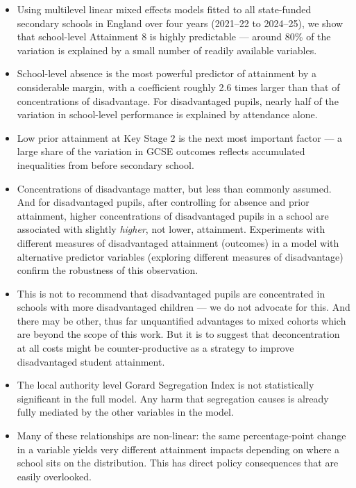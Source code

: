 \documentclass[
  11pt,
]{article}
\providecommand{\tightlist}{%
  \setlength{\itemsep}{0pt}\setlength{\parskip}{0pt}}
\begin{document}
\begin{itemize}
\tightlist
\item
  Using multilevel linear mixed effects models fitted to all
  state-funded secondary schools in England over four years (2021--22 to
  2024--25), we show that school-level Attainment 8 is highly
  predictable --- around 80\% of the variation is explained by a small
  number of readily available variables.
\item
  School-level absence is the most powerful predictor of attainment by a
  considerable margin, with a coefficient roughly 2.6 times larger than
  that of concentrations of disadvantage. For disadvantaged pupils,
  nearly half of the variation in school-level performance is explained
  by attendance alone.
\item
  Low prior attainment at Key Stage 2 is the next most important factor
  --- a large share of the variation in GCSE outcomes reflects
  accumulated inequalities from before secondary school.
\item
  Concentrations of disadvantage matter, but less than commonly assumed.
  And for disadvantaged pupils, after controlling for absence and prior
  attainment, higher concentrations of disadvantaged pupils in a school
  are associated with slightly \emph{higher}, not lower, attainment.
  Experiments with different measures of disadvantaged attainment
  (outcomes) in a model with alternative predictor variables (exploring
  different measures of disadvantage) confirm the robustness of this
  observation.
\item
  This is not to recommend that disadvantaged pupils are concentrated in
  schools with more disadvantaged children --- we do not advocate for
  this. And there may be other, thus far unquantified advantages to
  mixed cohorts which are beyond the scope of this work. But it is to
  suggest that deconcentration at all costs might be counter-productive
  as a strategy to improve disadvantaged student attainment.
\item
  The local authority level Gorard Segregation Index is not
  statistically significant in the full model. Any harm that segregation
  causes is already fully mediated by the other variables in the model.
\item
  Many of these relationships are non-linear: the same percentage-point
  change in a variable yields very different attainment impacts
  depending on where a school sits on the distribution. This has direct
  policy consequences that are easily overlooked.
\end{itemize}
\end{document}
